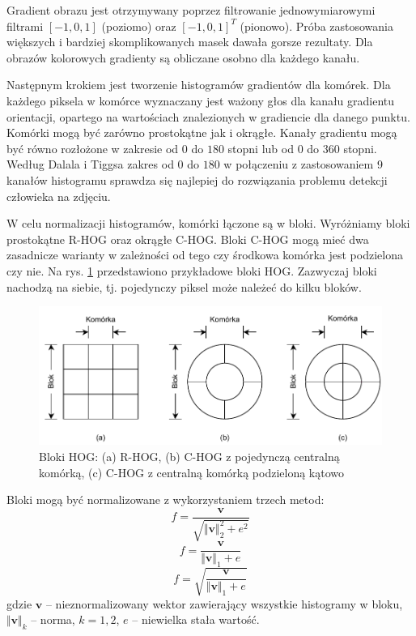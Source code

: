 Gradient obrazu jest otrzymywany poprzez filtrowanie jednowymiarowymi filtrami $[-1, 0, 1]$ (poziomo) oraz $[-1, 0, 1]^T$ (pionowo). Próba zastosowania większych i bardziej skomplikowanych masek dawała gorsze rezultaty. Dla obrazów kolorowych gradienty są obliczane osobno dla każdego kanału.

Następnym krokiem jest tworzenie histogramów gradientów dla komórek. Dla każdego piksela w komórce wyznaczany jest ważony głos dla kanału gradientu orientacji, opartego na wartościach znalezionych w gradiencie dla danego punktu. Komórki mogą być zarówno prostokątne jak i okrągłe. Kanały gradientu mogą być równo rozłożone w zakresie od $0$ do $180$ stopni lub od $0$ do $360$ stopni. Według Dalala i Tiggsa zakres od $0$ do $180$ w połączeniu z zastosowaniem 9 kanałów histogramu sprawdza się najlepiej do rozwiązania problemu detekcji człowieka na zdjęciu.

W celu normalizacji histogramów, komórki łączone są w bloki. Wyróżniamy bloki prostokątne R-HOG oraz okrągłe C-HOG. Bloki C-HOG mogą mieć dwa zasadnicze warianty w zależności od tego czy środkowa komórka jest podzielona czy nie. Na rys. \ref{fig:hog-blocks} przedstawiono przykładowe bloki HOG. Zazwyczaj bloki nachodzą na siebie, tj. pojedynczy piksel może należeć do kilku bloków.

\begin{figure}[h]
	\centering
	\includegraphics[scale=1.0]{graphics/01_podstawy_teoretyczne/hog-blocks.pdf}
	\caption{ Bloki HOG: (a) R-HOG, (b) C-HOG z pojedynczą centralną komórką, (c) C-HOG z centralną komórką podzieloną kątowo }
	\label{fig:hog-blocks}
\end{figure}

Bloki mogą być normalizowane z wykorzystaniem trzech metod:
\begin{equation} 
\label{hog_l2_norm} 
f = \frac{\boldsymbol{v}}{\sqrt{ {\Vert \boldsymbol{v} \Vert}_2^2 + e^2 }}
\end{equation}
\begin{equation} 
\label{hog_l1_norm} 
f = \frac{\boldsymbol{v}}{ {\Vert \boldsymbol{v} \Vert}_1 + e }
\end{equation}
\begin{equation} 
\label{hog_l1_sqrt} 
f = \sqrt{\frac{\boldsymbol{v}}{ {\Vert \boldsymbol{v} \Vert}_1 + e }}
\end{equation} gdzie $\boldsymbol{v}$ -- nieznormalizowany wektor zawierający wszystkie histogramy w bloku, ${\Vert \boldsymbol{v} \Vert}_k$ -- norma, $k = 1, 2$, $e$ -- niewielka stała wartość.

